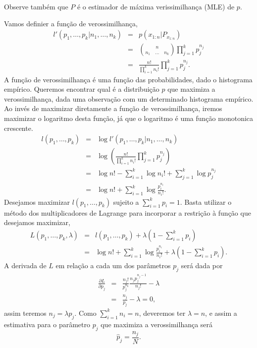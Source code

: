 \begin{questions}
\begin{solution}
\begin{parts}
Observe também que $P$ é o estimador de máxima verissimilhança (MLE) de $p$.

Vamos definier a função de verossimilhança,
\begin{eqnarray}
l'(p_1, \ldots, p_{k} \vert n_1, \ldots, n_{k}) &=& 
        p(x_{1:n} \vert P_{x_{1:n}}) \nonumber \\
        &=& { n \choose n_1 \quad \ldots \quad n_k } \prod_{j=1}^{ k } p_j^{n_j} \nonumber \\
        &=& \frac{ n! }{ \prod_{i=1}^{ k } n_i!} \prod_{j=1}^{ k } p_j^{n_j} . 
\end{eqnarray}
A função de verossimilhança é uma função das probabilidades, dado o histograma empírico.
Queremos encontrar qual é a distribuição $p$ que maximiza a verossimilhança,
dada uma observação com um determinado histograma empírico. Ao invés de
maximizar diretamente a função de verossimilhança, iremos maximizar o logaritmo desta
função, já que o logaritmo é uma função monotonica crescente.
\begin{eqnarray}
l( p_1, \ldots, p_{k} ) &=& \log l'(p_1, \ldots, p_{k} \vert n_1, \ldots, n_{k} ) \nonumber \\
        &=& \log \left(  \frac{ n! }{ \prod_{i=1}^{k} n_i!} \prod_{j=1}^{k} p_j^{n_j}  \right) \nonumber \\
        &=& \log n! - \sum_{i=1}^{k} \log n_i! + \sum_{j=1}^{k} \log p_j^{n_j} \nonumber \\
        &=& \log n! + \sum_{i=1}^{k}  \log \frac{p_i^{n_i}}{n_i!} .
\end{eqnarray}
Desejamos maximizar $l( p_1, \ldots, p_{k} )$
sujeito a $\sum_{i=1}^{k} p_i = 1$.
Basta utilizar o método dos multiplicadores de Lagrange para incorporar a
restrição à função que desejamos maximizar,
\begin{eqnarray}
L( p_1, \ldots, p_{k} , \lambda ) &=& l( p_1, \ldots, p_{k} ) +
        \lambda \left( 1 - \sum_{i=1}^{k} p_i \right) \nonumber \\
        &=& \log n! + \sum_{i=1}^{k}  \log \frac{p_i^{n_i}}{n_i!} +
        \lambda \left( 1 - \sum_{i=1}^{k} p_i \right) .
\end{eqnarray}
A derivada de $L$ em relação a cada um dos parâmetros $p_j$ será dada por
\begin{eqnarray}
\frac{\partial L}{\partial p_j} &=& \frac{n_j!}{p_j^{n_k}} \frac{n_j p_j^{n_j -1}}{n_j!} - \lambda \nonumber \\
        &=& \frac{n_j}{p_j} - \lambda = 0 ,
\end{eqnarray}
assim teremos $n_j = \lambda p_j$. Como $\sum_{i=1}^{k} n_i = n$,
deveremos ter $\lambda = n$, e assim a estimativa para o parâmetro $p_j$ que maximiza
a verossimilhança será
\begin{equation}
\hat{p}_j = \frac{n_j}{N} . 
\end{equation}



\end{parts}
\end{solution}
\end{questions}
